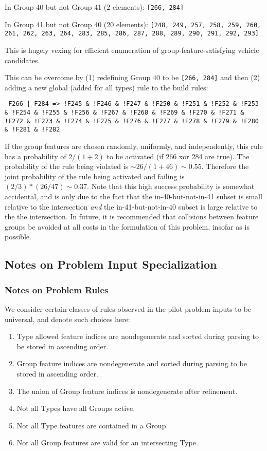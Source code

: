 \documentclass[aps,prl,twocolumn,superscriptaddress,groupedaddress]{revtex4}  %
\begin{document}
In Group 40 but not Group 41 (2 elements): \texttt{[266, 284]}

In Group 41 but not Group 40 (20 elements): \texttt{[248, 249, 257, 258, 259,
260, 261, 262, 263, 264, 283, 285, 286, 287, 288, 289, 290, 291, 292, 293]}

This is hugely vexing for efficient enumeration of group-feature-satisfying
vehicle candidates.

This can be overcome by (1) redefining Group 40 to be \texttt{[266, 284]} and
then (2) adding a new global (added for all types) rule to the build rules:

\texttt{ F266 | F284 => !F245 \& !F246 \& !F247 \& !F250 \& !F251 \& !F252 \& !F253 \&
!F254 \& !F255 \& !F256 \& !F267 \& !F268 \& !F269 \& !F270 \& !F271 \& !F272 \& !F273 \&
!F274 \& !F275 \& !F276 \& !F277 \& !F278 \& !F279 \& !F280 \& !F281 \& !F282}

If the group features are chosen randomly, uniformly, and independently, this
rule has a probability of $2/(1+2)$ to be activated (if 266 xor 284 are true).
The probability of the rule being violated is $\sim 26/(1+46) \sim 0.55$.
Therefore the joint probability of the rule being activated and failing is
$(2/3) * (26/47) \sim 0.37$. Note that this high success probability is somewhat
accidental, and is only due to the fact that the in-40-but-not-in-41 subset is
small relative to the intersection \emph{and} the in-41-but-not-in-40 subset is
large relative to the the intersection. In future, it is recommended that
collisions between feature groups be avoided at all costs in the formulation of
this problem, insofar as is possible.

\subsection{Notes on Problem Input Specialization}

\subsubsection{Notes on Problem Rules}

We consider certain classes of rules observed in the pilot problem inputs to be
universal, and denote such choices here:

\begin{enumerate}
\item Type allowed feature indices are nondegenerate and sorted during parsing
to be stored in ascending order.
\item Group feature indices are nondegenerate and sorted during parsing to be stored
in ascending order. 
\item The union of Group feature indices is nondegenerate after refinement.
\item Not all Types have all Groups active.
\item Not all Type features are contained in a Group.
\item Not all Group features are valid for an intersecting Type.
\end{enumerate}
\end{document}
